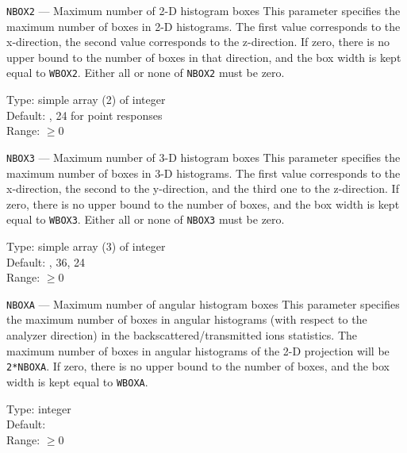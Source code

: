 \begin{keydescription}{\texttt{NBOX2} --- Maximum number of 2-D histogram boxes}
%
  This parameter specifies the maximum number of boxes in 2-D histograms. The first value 
  corresponds to the x-direction, the second value corresponds to the
  z-direction. If zero, there is no upper bound to the number of boxes in that
  direction, and the box width is kept equal to \texttt{WBOX2}. Either all or
  none of \texttt{NBOX2} must be zero.
  \begin{keytab}
    Type:    \> simple array (2) of integer \\
    Default: , 24 for point responses \\
    Range:   \> $\ge 0$
  \end{keytab}
\end{keydescription}

\begin{keydescription}{\texttt{NBOX3} --- Maximum number of 3-D histogram boxes}
%
  This parameter specifies the maximum number of boxes in 3-D histograms. The first value 
  corresponds to the x-direction, the second to the y-direction, and the third one to the 
  z-direction. If zero, there is no upper bound to the number of boxes, and the
  box width is kept equal to \texttt{WBOX3}. Either all or none of \texttt{NBOX3} must be zero. 
  \begin{keytab}
    Type:    \> simple array (3) of integer \\
    Default: , 36, 24 \\
    Range:   \> $\ge 0$
  \end{keytab}
\end{keydescription}

\begin{keydescription}{\texttt{NBOXA} --- Maximum number of angular histogram boxes}
%
  This parameter specifies the maximum number of boxes in angular histograms
  (with respect to the analyzer direction) in the backscattered/transmitted ions
  statistics.  The maximum number of boxes in angular histograms of the 2-D
  projection will be \texttt{2*NBOXA}. If zero, there is no upper bound to the
  number of boxes, and the box width is kept equal to \texttt{WBOXA}.
  \begin{keytab}
    Type:    \> integer \\
    Default:  \\
    Range:   \> $\ge 0$
  \end{keytab}
\end{keydescription}

